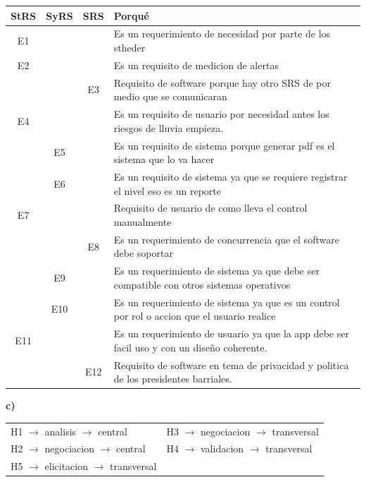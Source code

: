 \documentclass[11pt,a4paper]{article}
\begin{document}
\noindent
\begin{tabularx}{\textwidth}{|c|c|c|X|}
\hline
\textbf{StRS} & \textbf{SyRS} & \textbf{SRS} & \textbf{Porqué} \\ \hline
E1 & & & Es un requerimiento de necesidad por parte de los stheder \\ \hline
E2 & & & Es un requisito de medicion de alertas \\ \hline
 & & E3 & Requisito de software porque hay otro SRS de por medio que se comunicaran \\ \hline
E4 & & & Es un requisito de usuario por necesidad antes los riesgos de lluvia empieza. \\ \hline
 & E5 & & Es un requisito de sistema porque generar pdf es el sistema que lo va hacer \\ \hline
 & E6 & & Es un requisito de sistema ya que se requiere registrar el nivel eso es un reporte \\ \hline
E7 & & & Requisito de usuario de como lleva el control manualmente \\ \hline
 & & E8 & Es un requerimiento de concurrencia que el software debe soportar \\ \hline
 & E9 & & Es un requerimiento de sistema ya que debe ser compatible con otros sistemas operativos \\ \hline
 & E10 & & Es un requerimiento de sistema ya que es un control por rol o accion que el usuario realice \\ \hline
E11 & & & Es un requerimiento de usuario ya que la app debe ser facil uso y con un diseño coherente. \\ \hline
 & & E12 & Requisito de software en tema de privacidad y politica de los presidentes barriales. \\ \hline
\end{tabularx}

\vspace{0.5cm}

\noindent\textbf{c)}

\vspace{0.2cm}

\noindent
\begin{tabular}{ll}
H1 $\rightarrow$ analisis $\rightarrow$ central \hspace{1.5cm} & H3 $\rightarrow$ negociacion $\rightarrow$ transversal \\
H2 $\rightarrow$ negociacion $\rightarrow$ central & H4 $\rightarrow$ validacion $\rightarrow$ transversal \\
H5 $\rightarrow$ elicitacion $\rightarrow$ transversal & \\
\end{tabular}
\end{document}
